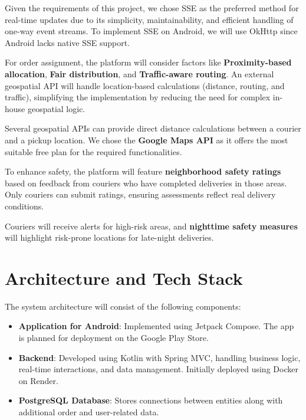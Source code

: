 \documentclass[a4paper,twoside,11pt]{article}
\begin{document}
{Given the requirements of this project, we chose SSE as the preferred method for real-time updates due to its simplicity, maintainability, and efficient handling of one-way event streams. To implement SSE on Android, we will use OkHttp since Android lacks native SSE support.

\vspace{2mm}

For order assignment, the platform will consider factors like \textbf{Proximity-based allocation}, \textbf{Fair distribution}, and \textbf{Traffic-aware routing}. An external geospatial API will handle location-based calculations (distance, routing, and traffic), simplifying the implementation by reducing the need for complex in-house geospatial logic.

\vspace{2mm}

Several geospatial APIs can provide direct distance calculations between a courier and a pickup location. We chose the \textbf{Google Maps API} as it offers the most suitable free plan for the required functionalities.

\vspace{2mm}

To enhance safety, the platform will feature \textbf{neighborhood safety ratings} based on feedback from couriers who have completed deliveries in those areas. Only couriers can submit ratings, ensuring assessments reflect real delivery conditions.  

Couriers will receive alerts for high-risk areas, and \textbf{nighttime safety measures} will highlight risk-prone locations for late-night deliveries.

\section*{Architecture and Tech Stack}

The system architecture will consist of the following components:

\begin{itemize}
    \item \textbf{Application for Android}: Implemented using Jetpack Compose. The app is planned for deployment on the Google Play Store.
    \item \textbf{Backend}: Developed using Kotlin with Spring MVC, handling business logic, real-time interactions, and data management. Initially deployed using Docker on Render.
    \item \textbf{PostgreSQL Database}: Stores connections between entities along with additional order and user-related data.
\end{itemize}

}
\end{document}
